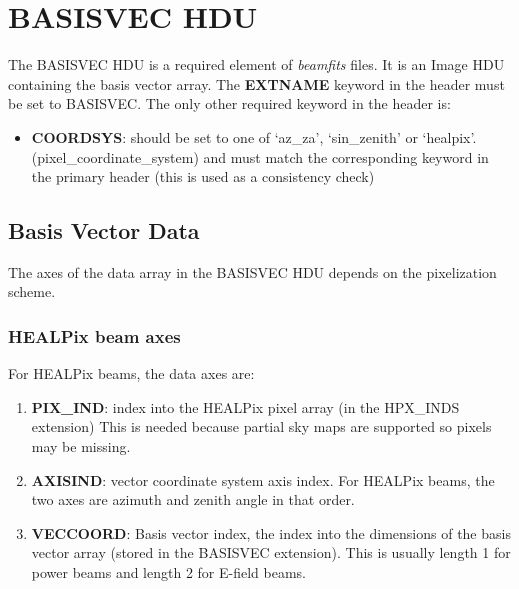 \documentclass[11pt, oneside]{article}   	%
\begin{document}
\section{BASISVEC HDU}
The BASISVEC HDU is a required element of \textit{beamfits} files. It is an Image HDU containing the basis vector array.
The \textbf{EXTNAME} keyword in the header must be set to BASISVEC. The only other required keyword in the header is:

\begin{itemize}
\item{\textbf{COORDSYS}: should be set to one of `az\_za', `sin\_zenith' or `healpix'. (pixel\_coordinate\_system) and must match the corresponding keyword in the primary header (this is used as a consistency check)}
\end{itemize}

\subsection{Basis Vector Data}
The axes of the data array in the BASISVEC HDU depends on the pixelization scheme.

\subsubsection{HEALPix beam axes}
For HEALPix beams, the data axes are: 
\begin{enumerate}
\item{\textbf{PIX\_IND}: index into the HEALPix pixel array (in the HPX\_INDS extension) This is needed because partial sky maps are supported so pixels may be missing.}
\item{\textbf{AXISIND}: vector coordinate system axis index. For HEALPix beams, the two axes are azimuth and zenith angle in that order.}
\item{\textbf{VECCOORD}: Basis vector index, the index into the dimensions of the basis vector array (stored in the BASISVEC extension). This is usually length 1 for power beams and length 2 for E-field beams.}
\end{enumerate}
\end{document}
